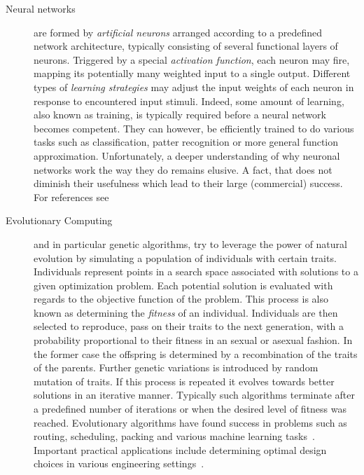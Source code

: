 		\begin{description}
			
			\item[Neural networks] are formed by \emph{artificial neurons} arranged according to a predefined network architecture, typically consisting of several functional layers of neurons. Triggered by a special \emph{activation function}, each neuron may fire, \ie mapping its potentially many weighted input to a single output. Different types of \emph{learning strategies} may adjust the input weights of each neuron in response to encountered input stimuli. Indeed, some amount of learning, also known as training, is typically required before a neural network becomes competent. They can however, be efficiently trained to do various tasks such as classification, patter recognition or more general function approximation. Unfortunately, a deeper understanding of why neuronal networks work the way they do remains elusive. A fact, that does not diminish their usefulness which lead to their large (commercial) success. For references see~\cite{Haykin:1998:NNC:521706,Fausett:1994:FNN:197023,Bishop:1995:NNP:525960}

			\item[Evolutionary Computing] and in particular genetic algorithms, try to leverage the power of natural evolution by simulating a population of individuals with certain traits. Individuals represent points in a search space associated with solutions to a given optimization problem. Each potential solution is evaluated with regards to the objective function of the problem. This process is also known as determining the \emph{fitness} of an individual. Individuals are then selected to reproduce, \ie pass on their traits to the next generation, with a probability proportional to their fitness in an sexual or asexual fashion. In the former case the offspring is determined by a recombination of the traits of the parents. Further genetic variations is introduced by random mutation of traits. If this process is repeated it evolves towards better solutions in an iterative manner. Typically such algorithms terminate after a predefined number of iterations or when the desired level of fitness was reached. Evolutionary algorithms have found success in problems such as routing, scheduling, packing and various machine learning tasks~\cite{Back:1997:HEC:548530,spears1993overview,zitzler2000comparison}. Important practical applications include determining optimal design choices in various engineering settings~\cite{Schwefel:1993:EOS:529401,kicinger2005evolutionary}.


\end{description}
